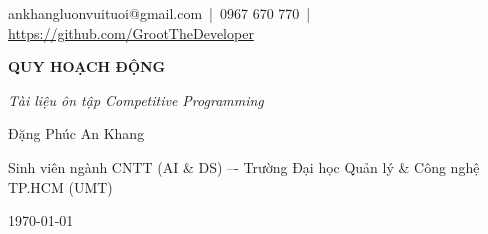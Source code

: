 \begin{titlepage}
\thispagestyle{empty}
\centering

\vspace*{1cm}

{\large ankhangluonvuituoi@gmail.com \,|\, 0967 670 770 \,|\, \url{https://github.com/GrootTheDeveloper}}\\[3.5cm]

{\fontsize{36}{40}\selectfont\bfseries QUY HOẠCH ĐỘNG\par} 
\vspace{0.6cm}
{\fontsize{18}{22}\selectfont\itshape Tài liệu ôn tập Competitive Programming \par}
\vspace{5cm}

{\Large Đặng Phúc An Khang\par}
\vspace{0.4cm}
{\large Sinh viên ngành CNTT (AI \& DS) –- Trường Đại học Quản lý \& Công nghệ TP.HCM (UMT)\par}
\vspace{1.2cm}

\vspace{10cm}

{\Large \today\par}

\vfill
\end{titlepage}
